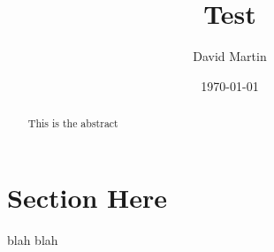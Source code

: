 \documentclass{article}
\begin{document}
	\title{Test}
	\author{David Martin}
	\date{\today}
	\maketitle
	
	\begin{abstract}
		This is the abstract
	\end{abstract}
	
	\section{Section Here}
		blah blah



	
\end{document}
